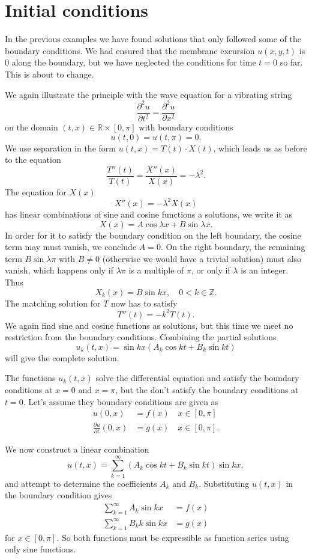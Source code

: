 %
%
%
\section{Initial conditions}
In the previous examples we have found solutions that only followed
some of the boundary conditions.
We had ensured that the membrane excursion $u(x,y,t)$ is $0$ along the
boundary, but we have neglected the conditions for time $t=0$ so far.
This is about to change.

We again illustrate the principle with the wave equation
for a vibrating string
\[
\frac{\partial^2 u}{\partial t^2}=\frac{\partial^2 u}{\partial x^2}
\]
on the domain
$(t,x)\in\mathbb R\times [0,\pi] $
with boundary conditions
\[
u(t,0)=u(t,\pi)=0.
\]
We use separation in the form
$u(t,x)=T(t)\cdot X(t)$,
which leads us as before to the equation
\[
\frac{T''(t)}{T(t)}=\frac{X''(x)}{X(x)}=-\lambda^2.
\]
The equation for $X(x)$
\[
X''(x)=-\lambda^2 X(x)
\]
has linear combinations of sine and cosine functions a solutions,
we write it as
\[
X(x)=A\cos\lambda x+B\sin\lambda x.
\]
In order for it to satisfy the boundary condition on the left boundary,
the cosine term may must vanish, we conclude $A=0$.
On the right boundary, the remaining term $B\sin\lambda \pi$ with $B\ne 0$
(otherwise we would have a trivial solution) must also vanish, 
which happens only if $\lambda\pi$ is a multiple of $\pi$, or only if
$\lambda$ is an integer.
Thus
\[
X_k(x)=B\sin kx, \quad 0<k\in\mathbb Z.
\]
The matching solution for $T$ now has to satisfy 
\[
T''(t)=-k^2T(t).
\]
We again find sine and cosine functions as solutions, but this time
we meet no restriction from the boundary conditions.
Combining the partial solutions 
\[
u_k(t,x)=\sin kx\left(A_k\cos kt+B_k\sin kt\right)
\]
will give the complete solution.

The functions $u_k(t,x)$ solve the differential equation and satisfy
the boundary conditions at $x=0$ and $x=\pi$, but the don't satisfy 
the boundary conditions at $t=0$.
Let's assume they boundary conditions are given as
\begin{align*}
u(0,x)&=f(x)\quad x\in[0,\pi]\\
\frac{\partial u}{\partial t}(0,x)&=g(x)\quad x\in[0,\pi].
\end{align*}

We now construct a linear combination
\[
u(t,x)=\sum_{k=1}^{\infty}
\left(A_k\cos kt+B_k\sin kt\right)
\sin kx,
\]
and attempt to determine the coefficients $A_k$ and $B_k$.
Substituting $u(t,x)$ in the boundary condition gives
\begin{align*}
\sum_{k=1}^{\infty}
A_k \sin kx
&=f(x)
\\
\sum_{k=1}^{\infty}
B_kk\sin kx
&=g(x)
\end{align*}
for $x\in[0,\pi]$.
So both functions must be expressible as function series using only 
sine functions.

